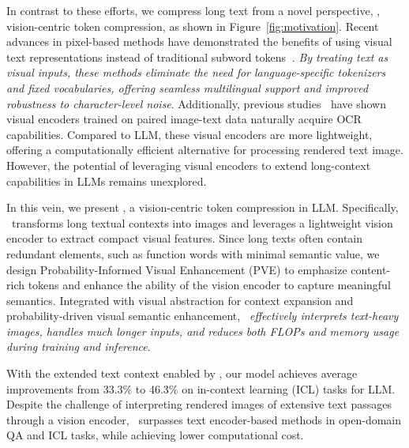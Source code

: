 In contrast to these efforts, we compress long text from a novel perspective, \ie, vision-centric token compression, as shown in Figure~\ref{fig:motivation}. Recent advances in pixel-based methods have demonstrated the benefits of using visual text representations instead of traditional subword tokens$_{\!}$~\cite{rust2022language,tschannen2023clippo,gao2024improving}. 
\textit{By treating text as visual inputs, these methods eliminate the need for language-specific tokenizers and fixed vocabularies, offering seamless multilingual support and improved robustness to character-level noise}.
Additionally, previous studies$_{\!}$~\cite{radford2021learning, lin2025parrot} have shown visual encoders trained on paired image-text data naturally acquire OCR capabilities.
Compared to LLM, these visual encoders are more lightweight, offering a computationally efficient alternative for processing rendered text image. 
However, the potential of leveraging visual encoders to extend long-context capabilities in LLMs remains unexplored.


In this vein, we present \textbf{\ourname}, a vision-centric token compression in LLM. 
Specifically, \ourname\ transforms long textual contexts into images and leverages a lightweight vision encoder to extract compact visual features.
Since long texts often contain redundant elements, such as function words with minimal semantic value, we design Probability-Informed
Visual Enhancement (PVE) to emphasize content-rich tokens and enhance the ability of the vision encoder to capture meaningful semantics. 
Integrated with visual abstraction for context expansion and probability-driven visual semantic enhancement, \textit{\ourname\ effectively interprets text-heavy images, handles much longer inputs, and reduces both FLOPs and memory usage during training and inference}.



With the extended text context enabled by \ourname, our model achieves average improvements from 33.3\% to 46.3\% on in-context learning (ICL) tasks for LLM.
Despite the challenge of interpreting rendered images of extensive text passages through a vision encoder, \ourname\ surpasses text encoder-based methods in open-domain QA and ICL tasks, while achieving lower computational cost.















 





